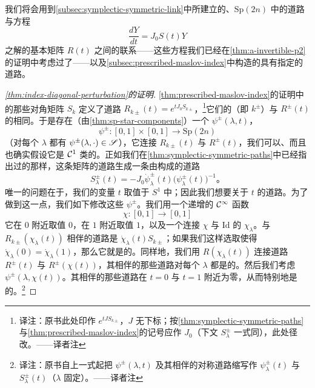 我们将会用到\cref{subsec:symplectic-symmetric-link}中所建立的、$\mathrm{Sp}(2n)$ 中的道路与方程
\[
\frac{dY}{dt}=J_0S(t)Y
\]
之解的基本矩阵 $R(t)$ 之间的联系——这些方程我们已经在\cref{thm:a-invertible-p2}的证明中考虑过了——以及\cref{subsec:prescribed-maslov-index}中构造的具有指定\trMaslovIndex{}的道路。

\begin{proof}[\cref{thm:index-diagonal-perturbation}的证明]
\cref{thm:prescribed-maslov-index}的证明中的那些对角矩阵 $S_k$ 定义了\trSymplectic{}道路 $R_{k\pm}(t)=e^{tJ_0S_{k\pm}}$，\footnote{译注：原书此处印作 $e^{tJS_{k\pm}}$，$J$ 无下标；按\cref{thm:symplectic-symmetric-paths}与\cref{thm:prescribed-maslov-index}的记号应作 $J_0$（下文 $S_\lambda^{\pm}$ 一式同），此处径改。——译者注}它们的\trMaslovIndex{}（即 $k^{\pm}$）与 $R^{\pm}(t)$ 的相同。于是存在（由\cref{thm:sp-star-components}）一个\trHomotopy{} $\psi^{\pm}(\lambda,t)$，
\[
\psi^{\pm}\colon[0,1]\times[0,1]\longrightarrow\mathrm{Sp}(2n)
\]
（对每个 $\lambda$ 都有 $\psi^{\pm}(\lambda,\cdot)\in\mathscr{S}$），它连接 $R_{k\pm}(t)$ 与 $R^{\pm}(t)$，我们可以、而且也确实假设它是 $\mathcal{C}^{1}$ 类的。正如我们在\cref{thm:symplectic-symmetric-paths}中已经指出过的那样，这条\trSymplectic{}矩阵的道路生成一条由\trSymmetricMatrix{}构成的道路
\[
S_\lambda^{\pm}(t)=-J_0\dot{\psi}_\lambda^{\pm}(t)\bigl(\psi_\lambda^{\pm}(t)\bigr)^{-1}\text{。}
\]
唯一的问题在于，我们的变量 $t$ 取值于 $S^{1}$ 中；因此我们想要关于 $t$ \trPeriodic{}的道路。为了做到这一点，我们如下修改这些\trHomotopy{} $\psi^{\pm}$。我们用一个递增的 $\mathcal{C}^\infty$ 函数
\[
\chi\colon[0,1]\longrightarrow[0,1]
\]
它在 $0$ 附近取值 $0$，在 $1$ 附近取值 $1$，以及一个连接 $\chi$ 与 $\mathrm{Id}$ 的\trHomotopy{} $\chi_\lambda$。与 $R_{k\pm}(\chi_\lambda(t))$ 相伴的\trSymmetricMatrix{}道路是 $\dot{\chi}_\lambda(t)S_{k\pm}$；如果我们这样选取\trHomotopy{}使得 $\dot{\chi}_\lambda(0)=\dot{\chi}_\lambda(1)$，那么它就是\trPeriodic{}的。同样地，我们用\trHomotopy{} $R(\chi_\lambda(t))$ 连接道路 $R^{\pm}(t)$ 与 $R^{\pm}(\chi(t))$，其相伴的那些\trSymmetricMatrix{}道路对每个 $\lambda$ 都是\trPeriodic{}的。然后我们考虑\trHomotopy{} $\psi^{\pm}(\lambda,\chi(t))$。其相伴的那些\trSymmetricMatrix{}道路在 $t=0$ 与 $t=1$ 附近为零，从而特别地是\trPeriodic{}的。\footnote{译注：原书自上一式起把\trHomotopy{} $\psi^{\pm}(\lambda,t)$ 及其相伴的对称道路缩写作 $\psi_\lambda^{\pm}(t)$ 与 $S_\lambda^{\pm}(t)$（$\lambda$ 固定）。——译者注}


\end{proof}
